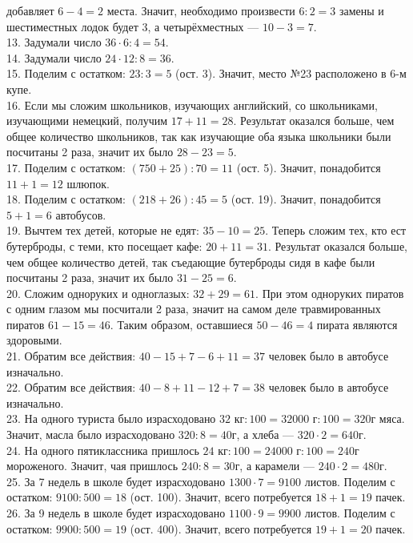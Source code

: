 \documentclass[12pt]{article}
\begin{document}
добавляет $6-4=2$ места. Значит, необходимо произвести $6:2=3$ замены и шестиместных лодок будет 3, а четырёхместных --- $10-3=7.$\\
13. Задумали число $36\cdot6:4=54.$\\
14. Задумали число $24\cdot12:8=36.$\\
15. Поделим с остатком: $23:3=5$ (ост. 3). Значит, место №23 расположено в 6-м купе.\\
16. Если мы сложим школьников, изучающих английский, со школьниками, изучающими немецкий, получим $17+11=28.$ Результат оказался больше, чем общее количество школьников, так как изучающие оба языка школьники были посчитаны 2 раза, значит их было $28-23=5.$\\
17. Поделим с остатком: $(750+25):70=11$ (ост. 5). Значит, понадобится $11+1=12$ шлюпок.\\
18. Поделим с остатком: $(218+26):45=5$ (ост. 19). Значит, понадобится $5+1=6$ автобусов.\\
19. Вычтем тех детей, которые не едят: $35-10=25.$ Теперь сложим тех, кто ест бутерброды, с теми, кто посещает кафе: $20+11=31.$ Результат оказался больше, чем общее количество детей, так съедающие бутерброды сидя в кафе были посчитаны 2 раза, значит их было $31-25=6.$\\
20. Сложим одноруких и одноглазых: $32+29=61.$ При этом одноруких пиратов с одним глазом мы посчитали 2 раза, значит на самом деле травмированных пиратов $61-15=46.$ Таким образом, оставшиеся $50-46=4$ пирата являются здоровыми.\\
21. Обратим все действия: $40-15+7-6+11=37$ человек было в автобусе изначально.\\
22. Обратим все действия: $40-8+11-12+7=38$ человек было в автобусе изначально.\\
23. На одного туриста было израсходовано $32\text{ кг}:100=32000\text{ г}:100=320$г мяса. Значит, масла было израсходовано $320:8=40$г, а хлеба --- $320\cdot2=640$г.\\
24. На одного пятиклассника пришлось $24\text{ кг}:100=24000\text{ г}:100=240$г мороженого. Значит, чая пришлось $240:8=30$г, а карамели --- $240\cdot2=480$г.\\
25. За 7 недель в школе будет израсходовано $1300\cdot7=9100$ листов. Поделим с остатком: $9100:500=18$ (ост. 100). Значит, всего потребуется $18+1=19$ пачек.\\
26. За 9 недель в школе будет израсходовано $1100\cdot9=9900$ листов. Поделим с остатком: $9900:500=19$ (ост. 400). Значит, всего потребуется $19+1=20$ пачек.\\
\end{document}
